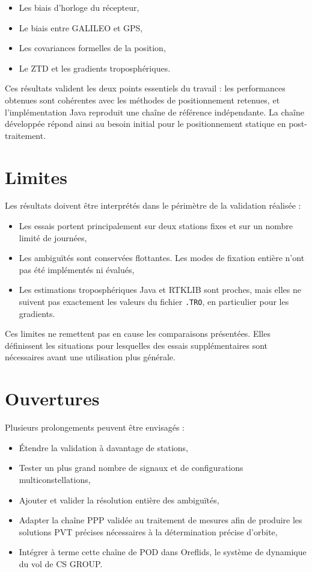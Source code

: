 \begin{itemize}
    \item Les biais d'horloge du récepteur,
    \item Le biais entre GALILEO et GPS,
    \item Les covariances formelles de la position,
    \item Le ZTD et les gradients troposphériques.
\end{itemize}

Ces résultats valident les deux points essentiels du travail : les performances
obtenues sont cohérentes avec les méthodes de positionnement retenues, et
l'implémentation Java reproduit une chaîne de référence indépendante. La chaîne
développée répond ainsi au besoin initial pour le positionnement statique en
post-traitement.

\section{Limites}

Les résultats doivent être interprétés dans le périmètre de la validation
réalisée :

\begin{itemize}
    \item Les essais portent principalement sur deux stations fixes et sur un
    nombre limité de journées,
    \item Les ambiguïtés sont conservées flottantes. Les modes de fixation
    entière n'ont pas été implémentés ni évalués,
    \item Les estimations troposphériques Java et RTKLIB sont proches, mais
    elles ne suivent pas exactement les valeurs du fichier \texttt{.TRO}, en
    particulier pour les gradients.
\end{itemize}

Ces limites ne remettent pas en cause les comparaisons présentées. Elles
définissent les situations pour lesquelles des essais supplémentaires sont
nécessaires avant une utilisation plus générale.

\section{Ouvertures}

Plusieurs prolongements peuvent être envisagés :

\begin{itemize}
    \item Étendre la validation à davantage de stations,
    \item Tester un plus grand nombre de signaux et de configurations
    multiconstellations,
    \item Ajouter et valider la résolution entière des ambiguïtés,
    \item Adapter la chaîne PPP validée au traitement de mesures afin de produire les solutions PVT précises nécessaires
    à la détermination précise d'orbite,
    \item Intégrer à terme cette chaîne de POD dans Oreflids, le système de
    dynamique du vol de CS GROUP.
\end{itemize}

